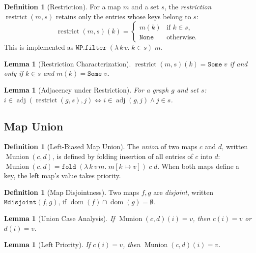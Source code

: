 \documentclass[11pt]{article}
\theoremstyle{plain}
\newtheorem{lemma}[theorem]{Lemma}
\theoremstyle{definition}
\newtheorem{definition}[theorem]{Definition}
\theoremstyle{remark}
\newcommand{\adj}{\operatorname{adj}}
\newcommand{\Mdomain}{\operatorname{dom}}
\newcommand{\Munion}{\operatorname{Munion}}
\newcommand{\restrict}{\operatorname{restrict}}
\begin{document}
\begin{definition}[Restriction]
For a map $m$ and a set $s$, the \emph{restriction} $\restrict(m, s)$ retains only the entries whose keys belong to $s$:
\[
  \restrict(m, s)(k) = \begin{cases} m(k) & \text{if } k \in s, \\ \texttt{None} & \text{otherwise}. \end{cases}
\]
This is implemented as $\texttt{WP.filter}\;(\lambda\,k\,v.\; k \in s)\;m$.
\end{definition}

\begin{lemma}[Restriction Characterization]
\label{lem:restrict-find}
$\restrict(m, s)(k) = \texttt{Some}\;v$ if and only if $k \in s$ and $m(k) = \texttt{Some}\;v$.
\end{lemma}

\begin{lemma}[Adjacency under Restriction]
\label{lem:adj-restrict}
For a graph $g$ and set $s$: $i \in \adj(\restrict(g,s), j) \iff i \in \adj(g,j) \wedge j \in s$.
\end{lemma}

\subsection{Map Union}

\begin{definition}[Left-Biased Map Union]
The \emph{union} of two maps $c$ and $d$, written $\Munion(c, d)$, is defined by folding insertion of all entries of $c$ into $d$:
$\Munion(c, d) = \texttt{fold}\;(\lambda\, k\, v\, m.\; m[k \mapsto v])\; c\; d$.
When both maps define a key, the left map's value takes priority.
\end{definition}

\begin{definition}[Map Disjointness]
Two maps $f, g$ are \emph{disjoint}, written $\texttt{Mdisjoint}(f, g)$, if
$\Mdomain(f) \cap \Mdomain(g) = \emptyset$.
\end{definition}

\begin{lemma}[Union Case Analysis]
\label{lem:munion-case}
If $\Munion(c,d)(i) = v$, then $c(i) = v$ or $d(i) = v$.
\end{lemma}

\begin{lemma}[Left Priority]
\label{lem:munion-find-l}
If $c(i) = v$, then $\Munion(c,d)(i) = v$.
\end{lemma}
\end{document}
